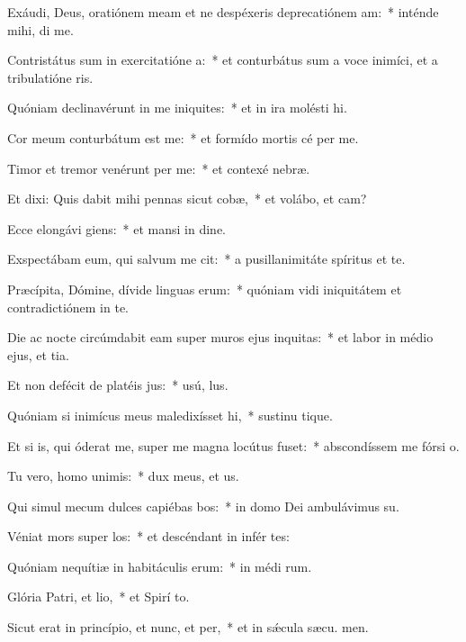 \item Exáudi, Deus, oratiónem meam et ne despéxeris deprecatiónem am:~* inténde mihi,  di me.
\item Contristátus sum in exercitatióne a:~* et conturbátus sum a voce inimíci, et a tribulatióne ris.
\item Quóniam declinavérunt in me iniquites:~* et in ira molésti  hi.
\item Cor meum conturbátum est  me:~* et formído mortis cé per me.
\item Timor et tremor venérunt per me:~* et contexé  nebræ.
\item Et dixi: Quis dabit mihi pennas sicut cobæ,~* et volábo, et cam?
\item Ecce elongávi giens:~* et mansi in dine.
\item Exspectábam eum, qui salvum me cit:~* a pusillanimitáte spíritus et te.
\item Præcípita, Dómine, dívide linguas erum:~* quóniam vidi iniquitátem et contradictiónem in te.
\item Die ac nocte circúmdabit eam super muros ejus inquitas:~* et labor in médio ejus, et tia.
\item Et non defécit de platéis jus:~* usú,  lus.
\item Quóniam si inimícus meus maledixísset hi,~* sustinu tique.
\item Et si is, qui óderat me, super me magna locútus fuset:~* abscondíssem me fórsi  o.
\item Tu vero, homo unimis:~* dux meus, et  us.
\item Qui simul mecum dulces capiébas bos:~* in domo Dei ambulávimus  su.
\item Véniat mors super los:~* et descéndant in infér tes:
\item Quóniam nequítiæ in habitáculis erum:~* in médi rum.
\item Glória Patri, et lio,~* et Spirí to.
\item Sicut erat in princípio, et nunc, et per,~* et in sǽcula sæcu. men.
